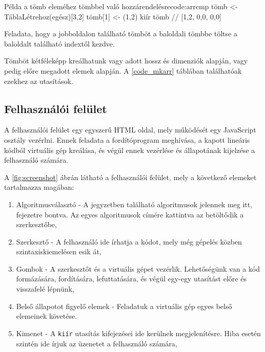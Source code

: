 \begin{code}{Példa a tömb eleméhez tömbbel való hozzárendelésre}{code:arrcmp}
tömb <- TáblaLétrehoz(egész)[3,2]
tömb[1] <- (1,2)
kiír tömb // [1,2, 0,0, 0,0]
\end{code}

Feladata, hogy a jobboldalon található tömböt a baloldali tömbbe töltse a baloldalt található indextől kezdve.


Tömböt kétféleképp kreálhatunk vagy adott hossz és dimenziók alapján, vagy pedig előre megadott elemek alapján. A \ref{code_mkarr} táblában találhatóak ezekhez az utasítások.

\subsection{Felhasználói felület}

A felhasználói felület egy egyszerű HTML oldal, mely működését egy JavaScript osztály vezérlni. Ennek feladata a fordítóprogram meghívása, a kapott lineáris kódból virtuális gép kreálása, és végül ennek vezérlése és állapotának kijelzése a felhasználó számára. 


A \ref{fig:screenshot} ábrán látható a felhasználói felület, mely a következő elemeket tartalmazza magában:

\begin{enumerate}
    \item Algoritmusválasztó - A jegyzetben található algoritmusok jelennek meg itt, fejezetre bontva. Az egyes algoritmusok címére kattintva az betöltődik a szerkesztőbe,
    \item Szerkesztő - A felhasználó ide írhatja a kódot, mely még gépelés közben szintaxiskiemelésen esik át,
    \item Gombok - A szerkesztőt és a virtuális gépet vezérlik. Lehetőségünk van a kód formázására, fordítására, lefuttatására, és végül egy-egy utasítást előre és visszafelé lépnünk,
    \item Belső állapotot figyelő elemek - Feladatuk a virtuális gép egyes belső elemeinek követése.
    \item Kimenet - A \texttt{kiír} utasítás kifejezései ide kerülnek megjelenítésre. Hiba esetén szintén ide írjuk az üzenetet a felhasználó számára,
\end{enumerate}

